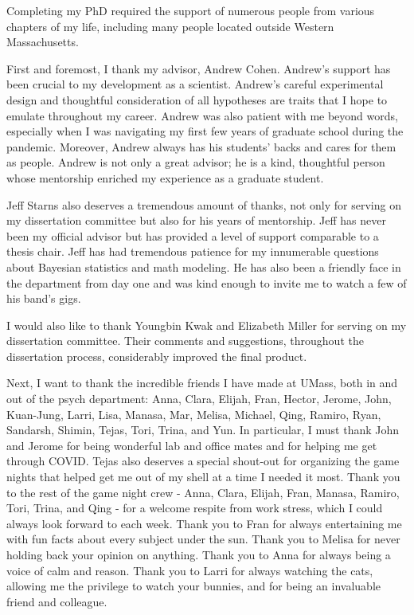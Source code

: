 Completing my PhD required the support of numerous people from various chapters of my life, including many people located outside Western Massachusetts.

First and foremost, I thank my advisor, Andrew Cohen. Andrew's support has been crucial to my development as a scientist. Andrew's careful experimental design and thoughtful consideration of all hypotheses are traits that I hope to emulate throughout my career. Andrew was also patient with me beyond words, especially when I was navigating my first few years of graduate school during the pandemic. Moreover, Andrew always has his students' backs and cares for them as people. Andrew is not only a great advisor; he is a kind, thoughtful person whose mentorship enriched my experience as a graduate student. 

Jeff Starns also deserves a tremendous amount of thanks, not only for serving on my dissertation committee but also for his years of mentorship. Jeff has never been my official advisor but has provided a level of support comparable to a thesis chair. Jeff has had tremendous patience for my innumerable questions about Bayesian statistics and math modeling. He has also been a friendly face in the department from day one and was kind enough to invite me to watch a few of his band's gigs. 

I would also like to thank Youngbin Kwak and Elizabeth Miller for serving on my dissertation committee. Their comments and suggestions, throughout the dissertation process, considerably improved the final product. 

Next, I want to thank the incredible friends I have made at UMass, both in and out of the psych department: Anna, Clara, Elijah, Fran, Hector, Jerome, John, Kuan-Jung, Larri, Lisa, Manasa, Mar, Melisa, Michael, Qing, Ramiro, Ryan, Sandarsh, Shimin, Tejas, Tori, Trina, and Yun. In particular, I must thank John and Jerome for being wonderful lab and office mates and for helping me get through COVID. Tejas also deserves a special shout-out for organizing the game nights that helped get me out of my shell at a time I needed it most. Thank you to the rest of the game night crew - Anna, Clara, Elijah, Fran, Manasa, Ramiro, Tori, Trina, and Qing - for a welcome respite from work stress, which I could always look forward to each week. Thank you to Fran for always entertaining me with fun facts about every subject under the sun. Thank you to Melisa for never holding back your opinion on anything. Thank you to Anna for always being a voice of calm and reason. Thank you to Larri for always watching the cats, allowing me the privilege to watch your bunnies, and for being an invaluable friend and colleague. 

